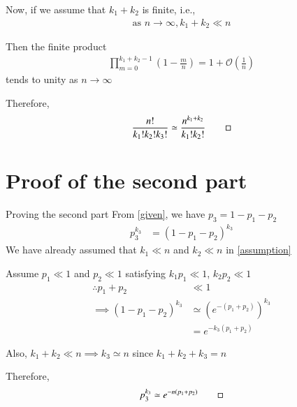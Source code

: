 \documentclass{beamer}
\providecommand{\brak}[1]{\ensuremath{\left(#1\right)}}
\begin{document}
	\begin{frame}
	Now, if we assume that $k_1 + k_2$ is finite, i.e.,
	\begin{align}
		\label{assumption}
		\text{as } n \to \infty, k_1 + k_2 \ll n
	\end{align}
	
	Then the finite product
	\begin{align}
		\prod_{m=0}^{k_1 + k_2 - 1} \brak{1 - \frac{m}{n}} = 1 + \mathcal{O} \brak{\frac1n} 
	\end{align}
	tends to unity as $n \to \infty$
	
	\begin{block}{}
	Therefore,
		\begin{align}
			\frac{n!}{k_1! k_2! k_3!} \simeq \frac{n^{k_1 + k_2}}{k_1! k_2!} \qed
		\end{align}
	\end{block}
	\end{frame}

	\section{Proof of the second part}
	\begin{frame}{Proving the second part}
	From \eqref{given}, we have $p_3 = 1 - p_1 - p_2$
	\begin{align}
		p_3^{k_3} &= (1 - p_1 - p_2)^{k_3}
	\end{align}
	We have already assumed that $k_1 \ll n$ and $k_2 \ll n$ in \eqref{assumption}
	
	Assume $p_1 \ll 1$ and $p_2 \ll 1$ satisfying $k_1 p_1 \ll 1$,  $k_2 p_2 \ll 1$
	\begin{align}
		\therefore p_1 + p_2 &\ll 1 \\
		\implies (1 - p_1 - p_2)^{k_3} &\simeq (e^{-(p_1 + p_2)})^{k_3} \\
		&= e^{-k_3(p_1 + p_2)}
	\end{align}
	
	Also, $k_1 + k_2 \ll n \implies k_3 \simeq n$ since $k_1 + k_2 + k_3 = n$
	
	\begin{block}{}
	Therefore,
		\begin{align}
			p_3^{k_3} \simeq e^{-n(p_1 + p_2)} \qed
		\end{align}
	\end{block}
	\end{frame}
	
\end{document}
